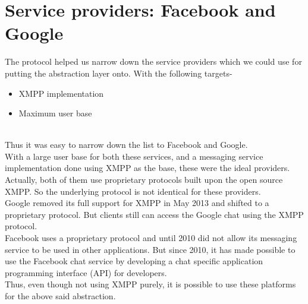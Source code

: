 \documentclass{SureshLimkar}
\begin{document}
\section {Service providers: Facebook and Google}
\hspace{0.5 in}The protocol helped us narrow down the service providers which we could use for putting the abstraction layer onto. With the following targets-
\begin{itemize}
 \item XMPP implementation
 \item Maximum user base
\end{itemize}
\\Thus it was easy to narrow down the list to Facebook and Google. 
\\With a large user base for both these services, and a messaging service implementation done using XMPP as the base, these were the ideal providers.
\\Actually, both of them use proprietary protocols built upon the open source XMPP.  So the underlying protocol is not identical for these providers.
\\Google removed its full support for XMPP in May 2013 and shifted to a proprietary protocol. But clients still can access the Google chat using the XMPP protocol. 
\\Facebook uses a proprietary protocol and until 2010 did not allow its messaging service to be used in other applications. But since 2010, it has made possible to use the Facebook chat service by developing a chat specific application programming interface (API) for developers.
\\Thus, even though not using XMPP purely, it is possible to use these platforms for the above said abstraction. 
\newpage
\end{document}
